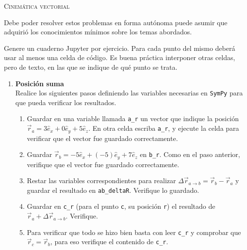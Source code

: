 \documentclass[11pt, a4paper, twoside]{article}
\begin{document}
\begin{center}
	\textsc{\large Cinemática vectorial}
\end{center}
Debe poder resolver estos problemas en forma autónoma puede asumir que adquirió los conocimientos mínimos sobre los temas abordados.


\noindent
Genere un cuaderno Jupyter por ejercicio.
Para cada punto del mismo deberá usar al menos una celda de código.
Es buena práctica interponer otras celdas, pero de texto, en las que se indique de qué punto se trata.
 
\begin{enumerate}
	
	\item
		\begin{minipage}[t][10.5cm]{0.55\textwidth}
			\textbf{Posición suma}\\
			Realice los siguientes pasos definiendo las variables necesarias en \verb'SymPy' para que pueda verificar los resultados.
			\begin{enumerate}
				\item Guardar en una variable llamada \verb"a_r" un vector que indique la posición $\vec{r}_a = 3 \hat{e}_x + 0 \hat{e}_y + 5 \hat{e}_z$.
				En otra celda escriba \verb"a_r", y ejecute la celda para verificar que el vector fue guardado correctamente. 
				\item Guardar $\vec{r}_b = -5 \hat{e}_x + (-5) \hat{e}_y + 7 \hat{e}_z$ en \verb"b_r". Como en el paso anterior, verifique que el vector fue guardado correctamente.
				\item Restar las variables correspondientes para realizar $\Delta \vec{r}_{a \to b} = \vec{r}_b - \vec{r}_a$ y guardar el resultado en \verb"ab_deltaR".
				Verifique lo guardado.
				\item Guardar en \verb"c_r" (para el punto \verb"c", su posición \verb"r") el resultado de $\vec{r}_a +\Delta \vec{r}_{a \to b}$.
				Verifique.
				\item Para verificar que todo se hizo bien basta con leer \verb"c_r" y comprobar que $\vec{r}_c = \vec{r}_b$, para eso verifique el contenido de \verb"c_r".
			\end{enumerate}
		\end{minipage}
		\begin{minipage}[c][-4cm][t]{0.4\textwidth}
			
			\end{minipage}



\end{enumerate}
\end{document}
